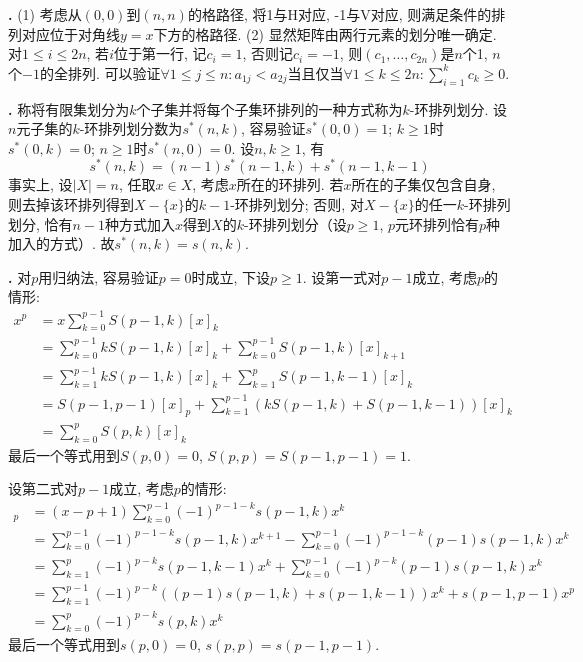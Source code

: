 \par \textbf{\thesolenum .} (1) 考虑从$(0,0)$到$(n,n)$的格路径, 将1与H对应, -1与V对应, 则满足条件的排列对应位于对角线$y=x$下方的格路径. (2) 显然矩阵由两行元素的划分唯一确定. 对$1\le i\le 2n$, 若$i$位于第一行, 记$c_i=1$, 否则记$c_i=-1$, 则$(c_1,\dots,c_{2n})$是$n$个1, $n$个$-1$的全排列. 可以验证$\forall 1\le j\le n: a_{1j} < a_{2j}$当且仅当$\forall 1\le k\le 2n: \sum_{i=1}^k c_k \ge 0$. 

\par \textbf{\thesolenum .} \cite{IC} 称将有限集划分为$k$个子集并将每个子集环排列的一种方式称为$k$-环排列划分. 设$n$元子集的$k$-环排列划分数为$s^*(n,k)$, 容易验证$s^*(0,0)=1$; $k\ge 1$时$s^*(0,k)=0$; $n\ge 1$时$s^*(n,0)=0$. 设$n,k\ge 1$, 有
\begin{equation*}
    s^*(n,k)=(n-1)s^*(n-1,k)+s^*(n-1,k-1)
\end{equation*}
事实上, 设$|X|=n$, 任取$x\in X$, 考虑$x$所在的环排列. 若$x$所在的子集仅包含自身, 则去掉该环排列得到$X-\{x\}$的$k-1$-环排列划分; 否则, 对$X-\{x\}$的任一$k$-环排列划分, 恰有$n-1$种方式加入$x$得到$X$的$k$-环排列划分（设$p\ge 1$, $p$元环排列恰有$p$种加入的方式）. 故$s^*(n,k)=s(n,k)$. 

\par \textbf{\thesolenum .} \cite{IC} 对$p$用归纳法, 容易验证$p=0$时成立, 下设$p\ge 1$. 设第一式对$p-1$成立, 考虑$p$的情形:
\begin{align*}
    x^p &= x \sum_{k=0}^{p-1} S(p-1,k) [x]_k \\ 
    &= \sum_{k=0}^{p-1} kS(p-1,k) [x]_k + \sum_{k=0}^{p-1} S(p-1,k) [x]_{k+1} \\ 
    & = \sum_{k=1}^{p-1} kS(p-1,k) [x]_k + \sum_{k=1}^{p} S(p-1,k-1) [x]_{k} \\ 
    & = S(p-1,p-1)[x]_p + \sum_{k=1}^{p-1} (kS(p-1,k)+S(p-1,k-1)) [x]_k\\
    & = \sum_{k=0}^p S(p,k) [x]_k
\end{align*}
最后一个等式用到$S(p,0)=0$, $S(p,p)=S(p-1,p-1)=1$.
\par 设第二式对$p-1$成立, 考虑$p$的情形:
\begin{align*}
    [x]_p &= (x-p+1) \sum_{k=0}^{p-1} (-1)^{p-1-k} s(p-1,k) x^k\\ 
    &= \sum_{k=0}^{p-1} (-1)^{p-1-k} s(p-1,k) x^{k+1} - \sum_{k=0}^{p-1} (-1)^{p-1-k} (p-1) s(p-1,k) x^k\\
    &= \sum_{k=1}^p (-1)^{p-k} s(p-1,k-1) x^{k} + \sum_{k=0}^{p-1} (-1)^{p-k} (p-1) s(p-1,k) x^k\\
    &= \sum_{k=1}^{p-1} (-1)^{p-k} ((p-1)s(p-1,k)+s(p-1,k-1)) x^{k} + s(p-1,p-1)x^p\\
    &= \sum_{k=0}^p (-1)^{p-k} s(p,k) x^{k}
\end{align*}
最后一个等式用到$s(p,0)=0$, $s(p,p)=s(p-1,p-1)$.

